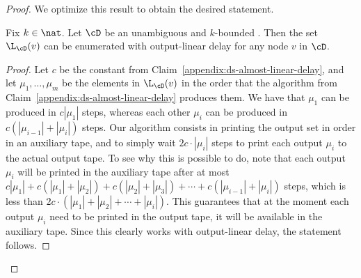 \begin{proof}
	We optimize this result to obtain the desired statement.
	
	\begin{proposition}
		Fix $k\in\nat$. Let $\cD$ be an unambiguous and $k$-bounded \dsabbr. Then the set $\L_{\cD}(v)$ can be enumerated with output-linear delay for any node $v$ in $\cD$.
	\end{proposition}

	\begin{proof}
		Let $c$ be the constant from Claim~\ref{appendix:ds-almost-linear-delay}, and let $\mu_1,\ldots,\mu_m$ be the elements in $\L_{\cD}(v)$ in the order that the algorithm from Claim~\ref{appendix:ds-almost-linear-delay} produces them.  We have that $\mu_1$ can be produced in $c|\mu_1|$ steps, whereas each other $\mu_i$ can be produced in $c(|\mu_{i-1}|+|\mu_i|)$ steps. 
		Our algorithm consists in printing the output set in order in an auxiliary tape, and to simply wait $2c\cdot|\mu_i|$ steps to print each output $\mu_i$ to the actual output tape.
		To see why this is possible to do, note that each output $\mu_i$ will be printed in the auxiliary tape after at most $c|\mu_1| + c(|\mu_1|+|\mu_2|) + c(|\mu_2|+|\mu_3|) + \cdots + c(|\mu_{i-1}|+|\mu_i|)$ steps, which is less than $2c\cdot(|\mu_1|+|\mu_2|+\cdots+|\mu_i|)$. This guarantees that at the moment each output $\mu_i$ need to be printed in the output tape, it will be available in the auxiliary tape.
		Since this clearly works with output-linear delay, the statement follows.
	\end{proof}
\end{proof}
